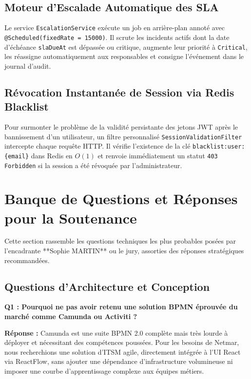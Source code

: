 \documentclass[12pt,a4paper]{article}
\begin{document}
\subsection{Moteur d'Escalade Automatique des SLA}
Le service \texttt{EscalationService} exécute un job en arrière-plan annoté avec \texttt{@Scheduled(fixedRate = 15000)}. Il scrute les incidents actifs dont la date d'échéance \texttt{slaDueAt} est dépassée ou critique, augmente leur priorité à \texttt{Critical}, les réassigne automatiquement aux responsables et consigne l'événement dans le journal d'audit.

\subsection{Révocation Instantanée de Session via Redis Blacklist}
Pour surmonter le problème de la validité persistante des jetons JWT après le bannissement d'un utilisateur, un filtre personnalisé \texttt{SessionValidationFilter} intercepte chaque requête HTTP. Il vérifie l'existence de la clé \texttt{blacklist:user:\{email\}} dans Redis en $O(1)$ et renvoie immédiatement un statut \texttt{403 Forbidden} si la session a été révoquée par l'administrateur.

\clearpage

\section{Banque de Questions et Réponses pour la Soutenance}

Cette section rassemble les questions techniques les plus probables posées par l'encadrante **Sophie MARTIN** ou le jury, assorties des réponses stratégiques recommandées.

\subsection{Questions d'Architecture et Conception}

\begin{mdframed}[backgroundcolor=lightbg, linecolor=primary, linewidth=1pt]
\textbf{Q1 : Pourquoi ne pas avoir retenu une solution BPMN éprouvée du marché comme Camunda ou Activiti ?}
\end{mdframed}
\textbf{Réponse :} Camunda est une suite BPMN 2.0 complète mais très lourde à déployer et nécessitant des compétences poussées. Pour les besoins de Netmar, nous recherchions une solution d'ITSM agile, directement intégrée à l'UI React via ReactFlow, sans ajouter une dépendance d'infrastructure volumineuse ni imposer une courbe d'apprentissage complexe aux équipes métiers.
\end{document}
